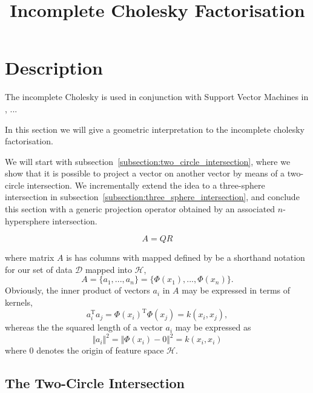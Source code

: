 \documentclass{article}
\newcommand{\x}{x}
\newcommand{\nonsv}{A}
\newcommand{\nonsve}{a}
\newcommand{\origin}{0}
\begin{document}
\title{Incomplete Cholesky Factorisation}
\maketitle

\tableofcontents

\section*{Description}

The incomplete Cholesky is used in conjunction with 
Support Vector Machines in \citep{fine01efficient}, ...


In this section we will give a geometric interpretation to 
the incomplete cholesky factorisation.

We will start with subsection~\ref{subsection:two_circle_intersection},
where we show that it is possible to project a vector on another vector
by means of a two-circle intersection. We incrementally extend the
idea to a three-sphere intersection in subsection~\ref{subsection:three_sphere_intersection},
and conclude this section with a generic projection operator
obtained by an associated $n$-hypersphere intersection.

$$A=QR$$

where matrix $\nonsv$ is has columns with mapped defined by be a
shorthand notation for our set of data $\mathcal{D}$ mapped into
$\mathcal{H}$,%
%
\begin{equation}
\nonsv=\{\nonsve_{1},...,\nonsve_{n}\}=\{\Phi(\x_{1}),...,\Phi(\x_{n})\}.
\label{equation:set_to_origin}
\end{equation}
%
Obviously, the inner product of vectors $\nonsve_{i}$ in $\nonsv$
may be expressed in terms of kernels,
%
\begin{equation}
\nonsve_{i}^{\mathrm{T}}\nonsve_{j}=\Phi(\x_{i})^{\mathrm{T}}\Phi(\x_{j})=k(\x_{i},\x_{j}),
\label{equation:inner_product_V}
\end{equation}%
%
whereas the the squared length of a vector $\nonsve_{i}$ may be expressed
as
%
$$\Vert\nonsve_{i}\Vert^{2}=\Vert\Phi(\x_{i})-\origin\Vert^{2}=k(\x_{i},\x_{i})$$
%
where $\origin$ denotes the origin of feature space $\mathcal{H}$.


\subsection{The Two-Circle Intersection\label{subsection:two_circle_intersection}}
\end{document}
